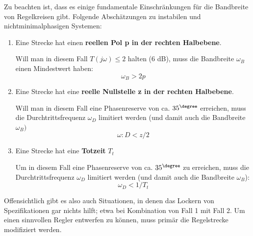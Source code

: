 Zu beachten ist, dass es einige fundamentale Einschränkungen für die Bandbreite
von Regelkreisen gibt. Folgende Abschätzungen zu
instabilen und nichtminimalphasigen Systemen:
\begin{enumerate}
\item Eine Strecke hat einen \textbf{reellen Pol p in der rechten Halbebene}. 

Will man in diesem Fall $T(j\omega) \leq 2$ halten (6 dB), muss die Bandbreite $\omega_B$
einen Mindestwert haben:
\[\omega_B > 2p\]
\item Eine Strecke hat eine \textbf{reelle Nullstelle z in der rechten 
Halbebene}.

Will man in diesem Fall eine Phasenreserve von ca. $35^{\degree}$ erreichen, muss die
Durchtrittsfrequenz $\omega_D$ limitiert werden (und damit auch die Bandbreite $\omega_B)$ \[\omega:D < z/2\]

\item Eine Strecke hat eine \textbf{Totzeit} $T_t$

Um in diesem Fall eine Phasenreserve von ca. $35^{\degree}$ zu erreichen, muss die Durchtrittsfrequenz
$\omega_D$ limitiert werden (und damit auch die Bandbreite $\omega_B$):
\[\omega_D < 1/T_t\]
\end{enumerate}
Offensichtlich gibt es also auch Situationen, in denen das Lockern von Spezifikationen
gar nichts hilft; etwa bei Kombination von Fall 1 mit Fall 2. Um einen sinnvollen
Regler entwerfen zu können, muss primär die Regelstrecke modifiziert werden.
